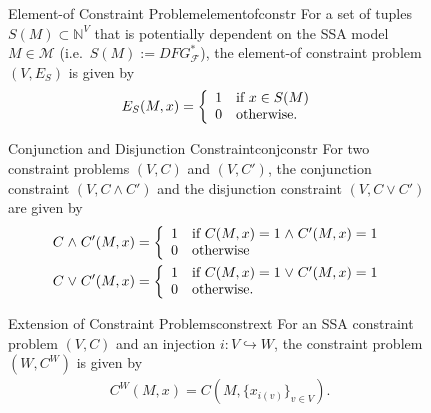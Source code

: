 \begin{figure}[p]
    \begin{definition}{Element-of Constraint Problem}{elementofconstr}
        For a set of tuples $S(M)\subset\mathbb N^V$ that is potentially
        dependent on the SSA model $M\in\mathcal M$
        (i.e.\ $S(M):=DFG_\mathcal F^*$),
        the element-of constraint problem $(V,E_S)$ is given by
        \begin{align*}
            E_S(M,x)=\left\{\begin{array}{l}
                                1\text{\quad if }x \in S(M)\\
                                0\text{\quad otherwise}.
                            \end{array}\right.
        \end{align*}
    \end{definition}

    \begin{definition}{Conjunction and Disjunction Constraint}{conjconstr}
        For two constraint problems $(V,C)$ and $(V,C')$, the
        conjunction constraint $(V,C\mathrel\land C')$ and the
        disjunction constraint $(V,C\mathrel\lor C')$ are given by
        \begin{align*}
            &C\mathrel\land C'(M,x)=\left\{
                \begin{array}{l}
                    1\text{\quad if }C(M,x)=1\mathrel\land C'(M,x)=1\\
                    0\text{\quad otherwise}
                \end{array}\right.\\
            &C\mathrel\lor C'(M,x)=\left\{
                \begin{array}{l}
                    1\text{\quad if }C(M,x)=1\mathrel\lor C'(M,x)=1\\
                    0\text{\quad otherwise}.
                \end{array}\right.
        \end{align*}
    \end{definition}

    \begin{definition}{Extension of Constraint Problems}{constrext}
        For an SSA constraint problem $(V,C)$ and an injection
        $i:V\hookrightarrow W$, the constraint problem $(W,C^W)$ is given by
        \begin{align*}
            C^W(M,x)=C(M,\{x_{i(v)}\}_{v\in V}).
        \end{align*}
    \end{definition}
\end{figure}

